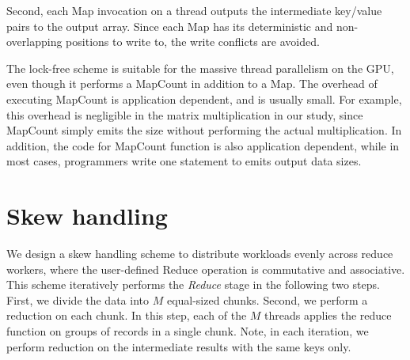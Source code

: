 Second, each Map invocation on a thread outputs the intermediate key/value pairs to
the output array.
Since each Map has its deterministic and non-overlapping positions to write to,
the write conflicts are avoided.


The lock-free scheme is suitable for the massive thread parallelism on the GPU, even
though it performs a MapCount in addition to a Map. The overhead of executing MapCount
is application dependent, and is usually small. For example, this overhead is negligible
in the matrix multiplication in our study, since MapCount simply emits the size without
performing the actual multiplication. In addition, the code for MapCount function is also application dependent, while in most cases, programmers write one statement to emits output data sizes. 


\section{Skew handling} \label{sec-reduce}

We design a skew handling scheme to distribute workloads evenly across reduce workers, where the user-defined Reduce operation is commutative and associative.
This scheme iteratively performs the {\em Reduce} stage in the following two steps.  First, we divide the data into $M$ equal-sized chunks.  Second, we perform a reduction on each chunk. In this step, each of the $M$ threads applies the reduce function on groups of records in a single chunk.  Note, in each iteration, we perform reduction on the intermediate results with the same keys only.

